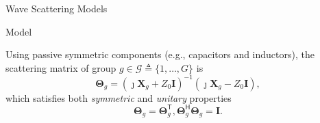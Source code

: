 \begin{section}{}
\begin{subsection}{Wave Scattering Models}
\begin{subsubsection}{ Model}

			Using passive symmetric components (e.g., capacitors and inductors), the scattering matrix of group $g \in \mathcal{G} \triangleq \{1, \ldots, G\}$ is \cite{Shen2020a}
			\begin{equation}
				\mathbf{\Theta}_g = (\jmath \mathbf{X}_g + Z_0 \mathbf{I})^{-1} (\jmath \mathbf{X}_g - Z_0 \mathbf{I}),
			\end{equation}
			which satisfies both \emph{symmetric} and \emph{unitary} properties
			\begin{subequations}
				\begin{equation}
					\mathbf{\Theta}_g = \mathbf{\Theta}_g^\mathsf{T},
					\label{eq:symmetric_property}
				\end{equation}
				\begin{equation}
					\mathbf{\Theta}_g^\mathsf{H} \mathbf{\Theta}_g = \mathbf{I}.
					\label{eq:unitary_property}
				\end{equation}
			\end{subequations}


\end{subsubsection}
\end{subsection}
\end{section}
